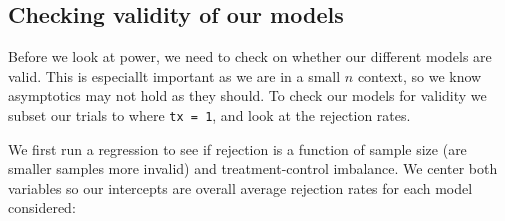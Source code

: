 \documentclass[
]{book}
\newenvironment{Shaded}{\begin{snugshade}}{\end{snugshade}}
\newcommand{\AttributeTok}[1]{\textcolor[rgb]{0.13,0.29,0.53}{#1}}
\newcommand{\DecValTok}[1]{\textcolor[rgb]{0.00,0.00,0.81}{#1}}
\newcommand{\FunctionTok}[1]{\textcolor[rgb]{0.13,0.29,0.53}{\textbf{#1}}}
\newcommand{\NormalTok}[1]{#1}
\newcommand{\OtherTok}[1]{\textcolor[rgb]{0.56,0.35,0.01}{#1}}
\newcommand{\SpecialCharTok}[1]{\textcolor[rgb]{0.81,0.36,0.00}{\textbf{#1}}}
\begin{document}
\subsection{Checking validity of our models}\label{checking-validity-of-our-models}

Before we look at power, we need to check on whether our different models are valid.
This is especiallt important as we are in a small \(n\) context, so we know asymptotics may not hold as they should.
To check our models for validity we subset our trials to where \texttt{tx\ =\ 1}, and look at the rejection rates.

We first run a regression to see if rejection is a function of sample size (are smaller samples more invalid) and treatment-control imbalance.
We center both variables so our intercepts are overall average rejection rates for each model considered:

\begin{Shaded}
\end{Shaded}
\end{document}
